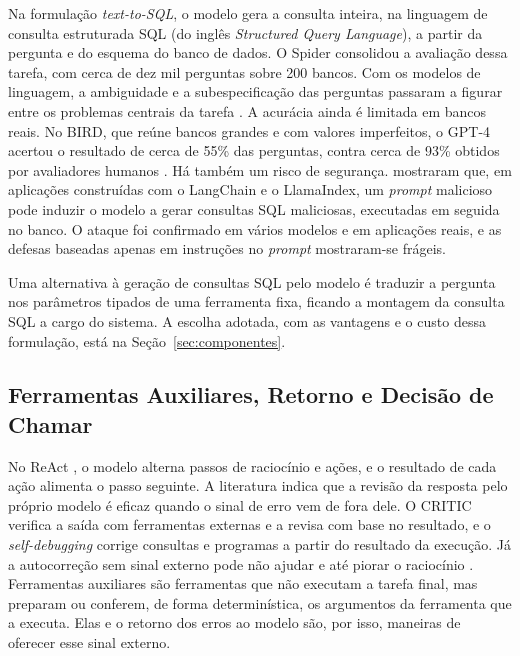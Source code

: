 Na formulação \textit{text-to-SQL}, o modelo gera a consulta inteira, na linguagem de consulta estruturada SQL (do inglês \textit{Structured Query Language}), a partir da pergunta e do esquema do banco de dados. O Spider \cite{yu2018spider} consolidou a avaliação dessa tarefa, com cerca de dez mil perguntas sobre 200 bancos. Com os modelos de linguagem, a ambiguidade e a subespecificação das perguntas passaram a figurar entre os problemas centrais da tarefa \cite{liu2025survey}. A acurácia ainda é limitada em bancos reais. No BIRD, que reúne bancos grandes e com valores imperfeitos, o GPT-4 acertou o resultado de cerca de 55\% das perguntas, contra cerca de 93\% obtidos por avaliadores humanos \cite{li2023bird}. Há também um risco de segurança.  mostraram que, em aplicações construídas com o LangChain \cite{langchain2022} e o LlamaIndex, um \textit{prompt} malicioso pode induzir o modelo a gerar consultas SQL maliciosas, executadas em seguida no banco. O ataque foi confirmado em vários modelos e em aplicações reais, e as defesas baseadas apenas em instruções no \textit{prompt} mostraram-se frágeis.

Uma alternativa à geração de consultas SQL pelo modelo é traduzir a pergunta nos parâmetros tipados de uma ferramenta fixa, ficando a montagem da consulta SQL a cargo do sistema. A escolha adotada, com as vantagens e o custo dessa formulação, está na Seção~\ref{sec:componentes}.

\subsection{Ferramentas Auxiliares, Retorno e Decisão de Chamar}
\label{sec:tc-retorno}

No ReAct \cite{yao2023react}, o modelo alterna passos de raciocínio e ações, e o resultado de cada ação alimenta o passo seguinte. A literatura indica que a revisão da resposta pelo próprio modelo é eficaz quando o sinal de erro vem de fora dele. O CRITIC \cite{gou2024critic} verifica a saída com ferramentas externas e a revisa com base no resultado, e o \textit{self-debugging} \cite{chen2024selfdebug} corrige consultas e programas a partir do resultado da execução. Já a autocorreção sem sinal externo \cite{madaan2023selfrefine} pode não ajudar e até piorar o raciocínio \cite{huang2024cannot}. Ferramentas auxiliares são ferramentas que não executam a tarefa final, mas preparam ou conferem, de forma determinística, os argumentos da ferramenta que a executa. Elas e o retorno dos erros ao modelo são, por isso, maneiras de oferecer esse sinal externo.


